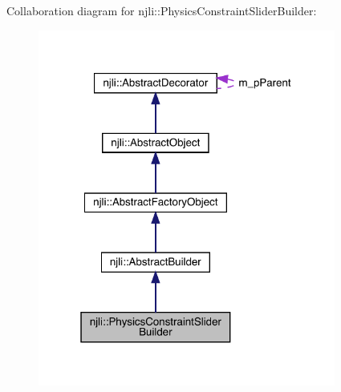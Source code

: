 Collaboration diagram for njli\+:\+:Physics\+Constraint\+Slider\+Builder\+:\nopagebreak
\begin{figure}[H]
\begin{center}
\leavevmode
\includegraphics[width=277pt]{classnjli_1_1_physics_constraint_slider_builder__coll__graph}
\end{center}
\end{figure}
